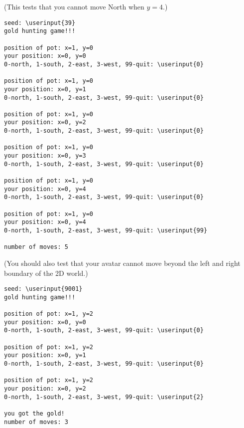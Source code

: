 \nextt
(This tests that you cannot move North when $y=4$.)
\begin{Verbatim}[frame=single, commandchars=\\\{\}]
seed: \userinput{39}
gold hunting game!!!

position of pot: x=1, y=0
your position: x=0, y=0
0-north, 1-south, 2-east, 3-west, 99-quit: \userinput{0}

position of pot: x=1, y=0
your position: x=0, y=1
0-north, 1-south, 2-east, 3-west, 99-quit: \userinput{0}

position of pot: x=1, y=0
your position: x=0, y=2
0-north, 1-south, 2-east, 3-west, 99-quit: \userinput{0}

position of pot: x=1, y=0
your position: x=0, y=3
0-north, 1-south, 2-east, 3-west, 99-quit: \userinput{0}

position of pot: x=1, y=0
your position: x=0, y=4
0-north, 1-south, 2-east, 3-west, 99-quit: \userinput{0}

position of pot: x=1, y=0
your position: x=0, y=4
0-north, 1-south, 2-east, 3-west, 99-quit: \userinput{99}

number of moves: 5
\end{Verbatim}

(You should also test that your avatar cannot move beyond the left and right
boundary of the 2D world.)

\nextt
\begin{Verbatim}[frame=single, commandchars=\\\{\}]
seed: \userinput{9001}
gold hunting game!!!

position of pot: x=1, y=2
your position: x=0, y=0
0-north, 1-south, 2-east, 3-west, 99-quit: \userinput{0}

position of pot: x=1, y=2
your position: x=0, y=1
0-north, 1-south, 2-east, 3-west, 99-quit: \userinput{0}

position of pot: x=1, y=2
your position: x=0, y=2
0-north, 1-south, 2-east, 3-west, 99-quit: \userinput{2}

you got the gold!
number of moves: 3
\end{Verbatim}
